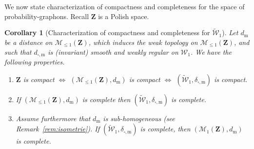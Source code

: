 \documentclass{amsart}
\theoremstyle{plain}
\newtheorem{corol}[Th]{Corollary}
\theoremstyle{definition}
\newcommand{\Space}{\mathbf{Z}}
\newcommand{\Proba}{\mathcal{M}_1(\Space)}
\newcommand{\SubProba}{\mathcal{M}_{\leq1}(\Space)}
\newcommand{\Graphon}{\mathcal{W}_1}
\newcommand{\UGraphon}{\widetilde{\mathcal{W}}_1}
\newcommand{\m}{\mathrm{m}}
\newcommand{\dmeas}{d_\m}
\newcommand{\dcut}{d_{\square,\m}}
\newcommand{\ddcut}{\delta_{\square,\m}}
\begin{document}
We now state characterization of compactness and completeness
for the space of probability-graphons. Recall $\Space$ is a Polish
space. 

\begin{corol}[Characterization of compactness and completeness for
  $\UGraphon$]
  \label{cor:W1compact}
  Let $\dmeas$ be  a distance on $\SubProba$, which  induces 
  	the weak topology on $\SubProba$,
  and  such that  $\dcut$ is (invariant) smooth  and weakly
  regular on $\Graphon$.  We have the following properties.
\begin{enumerate}[label=(\roman*)]
\item \label{it:topo_compact} 
  $\Space$ is compact
  $\iff$ $(\SubProba, \dmeas)$ is compact
  $\iff$   $(\UGraphon, \ddcut)$ is compact.
\item \label{it:topo_complete} 
If $(\SubProba, \dmeas)$ is complete then  $(\UGraphon, \ddcut)$ is
complete. 
\item  \label{it:topo_complete_2}  Assume  furthermore that  $\dmeas$  is
  sub-homogeneous  (see  Remark~\ref{rem:isometrie}).
If $(\UGraphon, \ddcut)$  is
  complete, then  $(\Proba,  \dmeas)$ is  complete.
\end{enumerate}
\end{corol}
\end{document}
